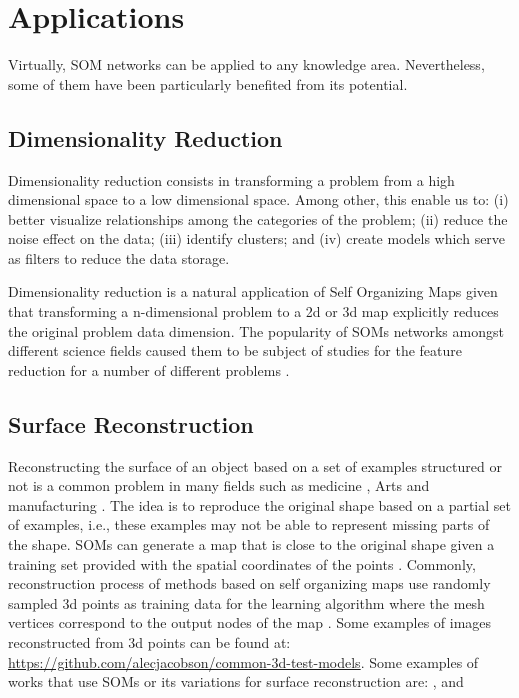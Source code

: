 \section{Applications}

Virtually, SOM networks can be applied to any knowledge area. Nevertheless, some of them have been particularly benefited from its potential.

\subsection{Dimensionality Reduction}

Dimensionality reduction consists in transforming a problem from a high dimensional space to a low dimensional space. Among other, this enable us to: (i) better visualize relationships among the categories of the problem; (ii) reduce the noise effect on the data; (iii) identify clusters; and (iv) create models which serve as filters to reduce the data storage. 

Dimensionality reduction is a natural application of Self Organizing Maps given that transforming a n-dimensional problem to a 2d or 3d map explicitly reduces the original problem data dimension. The popularity of SOMs networks amongst different science fields caused them to be subject of studies for the feature reduction for a number of different problems \cite{pmid:24575660}\cite{Pratiwi2012TheUO}\cite{kutlu}\cite{liu}.



\subsection{Surface Reconstruction}

Reconstructing the surface of an object based on a set of examples structured or not is a common problem in many fields such as medicine \cite{Satava}, Arts \cite{974519} and manufacturing \cite{Bernardini}. The idea is to reproduce the original shape based on a partial set of examples, i.e., these examples may not be able to represent missing parts of the shape. SOMs can generate a map that is close to the original shape given a training set provided with the spatial coordinates of the points \cite{4371248}. Commonly, reconstruction process of methods based on self organizing maps use randomly sampled 3d points as training data for the learning algorithm where the mesh vertices correspond to the output nodes of the map \cite{4371248}. Some examples of images reconstructed from 3d points can be found at: \url{https://github.com/alecjacobson/common-3d-test-models}. Some examples of works that use SOMs or its variations for surface reconstruction are: \cite{Yu99surfacereconstruction}, \cite{1380023} and \cite{4371248}

